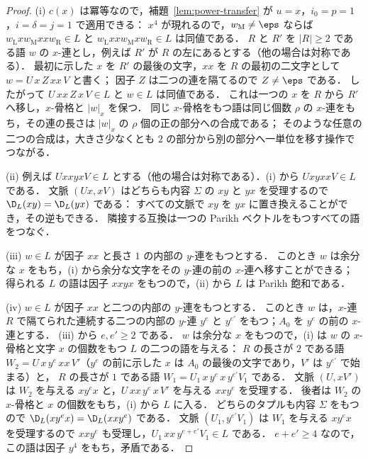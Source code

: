 \begin{proof}
(i) $c(x)$ は冪等なので，補題~\ref{lem:power-transfer} が $u=x$，$i_0=p=1$，$i=\delta=j=1$ で適用できる：
$x^4$ が現れるので，$w_{\mathrm M}\ne\eps$ ならば
$w_{\mathrm L}xw_{\mathrm M}xxw_{\mathrm R}\in L$ と $w_{\mathrm L}xxw_{\mathrm M}xw_{\mathrm R}\in L$ は同値である．
$R$ と $R'$ を $|R|\ge2$ である語 $w$ の $x$-連とし，例えば $R'$ が $R$ の左にあるとする（他の場合は対称である）．
最初に示した $x$ を $R'$ の最後の文字，$xx$ を $R$ の最初の二文字として $w=U\,x\,Z\,xx\,V$ と書く；
因子 $Z$ は二つの連を隔てるので $Z\ne\eps$ である．
したがって $U\,xx\,Z\,x\,V\in L$ と $w\in L$ は同値である．
これは一つの $x$ を $R$ から $R'$ へ移し，$x$-骨格と $|w|_x$ を保つ．
同じ $x$-骨格をもつ語は同じ個数 $\rho$ の $x$-連をもち，その連の長さは $|w|_x$ の $\rho$ 個の正の部分への合成である；
そのような任意の二つの合成は，大きさ少なくとも $2$ の部分から別の部分へ一単位を移す操作でつながる．

(ii) 例えば $UxxyxV\in L$ とする（他の場合は対称である）．(i) から $UxyxxV\in L$ である．
文脈 $(Ux,xV)$ はどちらも内容 $\Sigma$ の $xy$ と $yx$ を受理するので $\D_L(xy)=\D_L(yx)$ である：
すべての文脈で $xy$ を $yx$ に置き換えることができ，その逆もできる．
隣接する互換は一つの Parikh ベクトルをもつすべての語をつなぐ．

(iii) $w\in L$ が因子 $xx$ と長さ $1$ の内部の $y$-連をもつとする．
このとき $w$ は余分な $x$ をもち，(i) から余分な文字をその $y$-連の前の $x$-連へ移すことができる；
得られる $L$ の語は因子 $xxyx$ をもつので，(ii) から $L$ は Parikh 飽和である．

(iv) $w\in L$ が因子 $xx$ と二つの内部の $y$-連をもつとする．
このとき $w$ は，$x$-連 $R$ で隔てられた連続する二つの内部の $y$-連 $y^e$ と $y^{e'}$ をもつ；$A_0$ を $y^e$ の前の $x$-連とする．
(iii) から $e,e'\ge2$ である．
$w$ は余分な $x$ をもつので，(i) は $w$ の $x$-骨格と文字 $x$ の個数をもつ $L$ の二つの語を与える：
$R$ の長さが $2$ である語 $W_2=U\,x\,y^e\,xx\,V'$（$y^e$ の前に示した $x$ は $A_0$ の最後の文字であり，$V'$ は $y^{e'}$ で始まる）と，
$R$ の長さが $1$ である語 $W_1=U_1\,x\,y^e\,x\,y^{e'}V_1$ である．
文脈 $(U,xV')$ は $W_2$ を与える $xy^ex$ と，$U\,xx\,y^e\,x\,V'$ を与える $xxy^e$ を受理する．
後者は $W_2$ の $x$-骨格と $x$ の個数をもち，(i) から $L$ に入る．
どちらのタプルも内容 $\Sigma$ をもつので $\D_L(xy^ex)=\D_L(xxy^e)$ である．
文脈 $(U_1,y^{e'}V_1)$ は $W_1$ を与える $xy^ex$ を受理するので $xxy^e$ も受理し，$U_1\,xx\,y^{e+e'}V_1\in L$ である．
$e+e'\ge4$ なので，この語は因子 $y^4$ をもち，矛盾である．
\end{proof}

